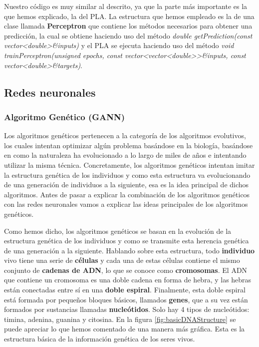 Nuestro código es muy similar al descrito, ya que la parte más importante es la que hemos explicado, la del PLA. La estructura que hemos empleado es la de una clase llamada \textbf{Perceptron} que contiene los métodos necesarios para obtener una predicción, la cual se obtiene haciendo uso del método \textit{double getPrediction(const vector\textless double\textgreater \&inputs)} y el PLA se ejecuta haciendo uso del método \textit{void trainPerceptron(unsigned epochs, const vector\textless vector\textless double\textgreater \textgreater \&inputs, const vector\textless double\textgreater \&targets)}.

\newpage
\subsection{Redes neuronales}
\label{subsec:nn}


\newpage
\subsubsection{Algoritmo Genético (GANN)}
\label{subsubsec:nn:gann}

Los algoritmos genéticos pertenecen a la categoría de los algoritmos evolutivos, los cuales intentan optimizar algún problema basándose en la biología, basándose en como la naturaleza ha evolucionado a lo largo de miles de años e intentando utilizar la misma técnica. Concretamente, los algoritmos genéticos intentan imitar la estructura genética de los individuos y como esta estructura va evolucionando de una generación de individuos a la siguiente, esa es la idea principal de dichos algoritmos. Antes de pasar a explicar la combinación de los algoritmos genéticos con las redes neuronales vamos a explicar las ideas principales de los algoritmos genéticos.

Como hemos dicho, los algoritmos genéticos se basan en la evolución de la estructura genética de los individuos y como se transmite esta herencia genética de una generación a la siguiente. Hablando sobre esta estructura, todo \textbf{individuo} vivo tiene una serie de \textbf{células} y cada una de estas células contiene el mismo conjunto de \textbf{cadenas de ADN}, lo que se conoce como \textbf{cromosomas}. El ADN que contiene un cromosoma es una doble cadena en forma de hebra, y las hebras están conectadas entre sí en una \textbf{doble espiral}. Finalmente, esta doble espiral está formada por pequeños bloques básicos, llamados \textbf{genes}, que a su vez están formados por sustancias llamadas \textbf{nucleótidos}. Solo hay 4 tipos de nucleótidos: timina, adenina, guanina y citosina. En la figura \ref{fig:basicDNAStructure} se puede apreciar lo que hemos comentado de una manera más gráfica. Esta es la estructura básica de la información genética de los seres vivos.

